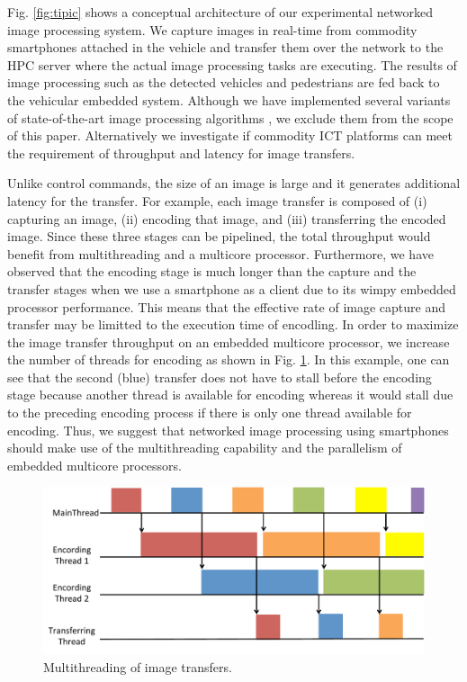 Fig. \ref{fig:tipic} shows a conceptual architecture of our experimental
networked image processing system.
We capture images in real-time from commodity smartphones attached in
the vehicle and transfer them over the network to the HPC server where
the actual image processing tasks are executing.
The results of image processing such as the detected vehicles and
pedestrians are fed back to the vehicular embedded system.
Although we have implemented several variants of state-of-the-art image
processing algorithms \cite{Hirabayashi13}, we exclude them from the
scope of this paper.
Alternatively we investigate if commodity ICT platforms can meet the
requirement of throughput and latency for image transfers.

Unlike control commands, the size of an image is large and it generates
additional latency for the transfer.
For example, each image transfer is composed of (i) capturing an image,
(ii) encoding that image, and (iii) transferring the encoded image.
Since these three stages can be pipelined, the total throughput would
benefit from multithreading and a multicore processor.
Furthermore, we have observed that the encoding stage is much longer
than the capture and the transfer stages when we use a smartphone as a
client due to its wimpy embedded processor performance.
This means that the effective rate of image capture and transfer may be
limitted to the execution time of encodling.
In order to maximize the image transfer throughput on an embedded
multicore processor, we increase the number of threads for encoding as
shown in Fig. \ref{fig:multithread}.
In this example, one can see that the second (blue) transfer does not
have to stall before the encoding stage because another thread is
available for encoding whereas it would stall due to the preceding
encoding process if there is only one thread available for encoding.
Thus, we suggest that networked image processing using smartphones
should make use of the multithreading capability and the parallelism of
embedded multicore processors.

\begin{figure}[!t]
 \centering
 \includegraphics[width=0.9\hsize]{fig/multithread.pdf}
 \caption{Multithreading of image transfers.}
 \label{fig:multithread}
\end{figure}

